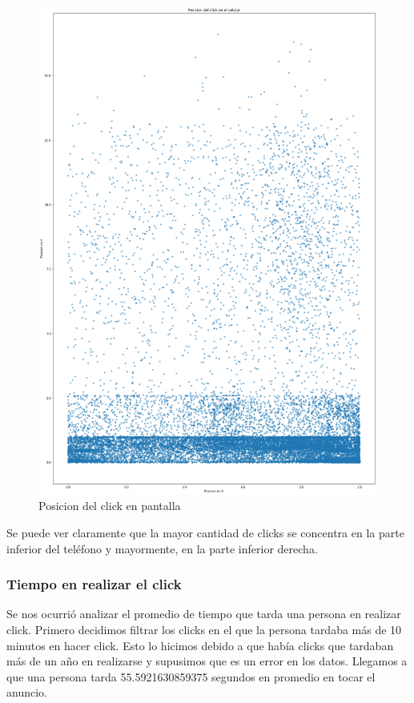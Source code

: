 \documentclass[a4paper, 12pt]{article}
\begin{document}
		\FloatBarrier
		\begin{figure}[h]
			\centering
			\includegraphics[scale=0.2]{images/clicks/clicks_touch_scatter.png}
			\caption{Posicion del click en pantalla}
		\end{figure}
		\FloatBarrier


		 Se puede ver claramente que la mayor cantidad de clicks se concentra en la parte inferior del teléfono y
		mayormente, en la parte inferior derecha.


	\subsubsection{Tiempo en realizar el click}
 
		 Se nos ocurrió analizar el promedio de tiempo que tarda una persona en realizar click. Primero decidimos filtrar los clicks en el que la persona tardaba más de 10 minutos en hacer click. Esto lo hicimos debido a que había clicks que tardaban más de un año en realizarse y supusimos que es un error en los datos. Llegamos a que una persona tarda 55.5921630859375 segundos en promedio en tocar el anuncio.
\end{document}
